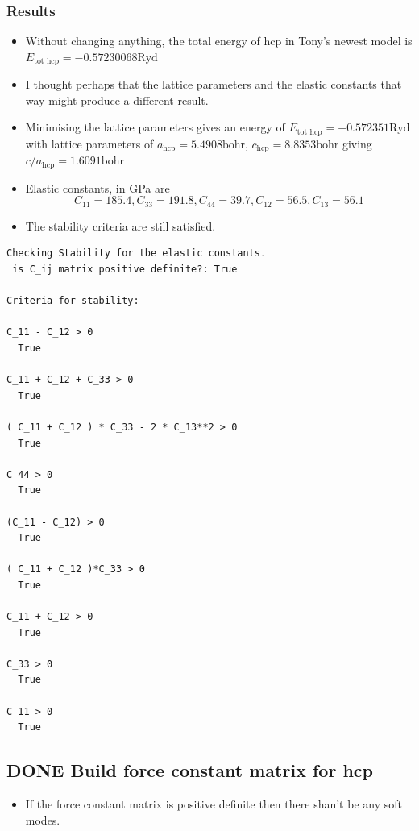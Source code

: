 \documentclass[11pt]{article}
\begin{document}
\subsubsection{Results}
\label{sec-1-9-1}
\begin{itemize}
\item Without changing anything, the total energy of hcp in Tony's newest
model is $E_{\text{tot hcp}} = -0.57230068 \text{Ryd}$
\item I thought perhaps that the lattice parameters and the elastic constants
that way might produce a different result.
\item Minimising the lattice parameters gives an energy of  $E_{\text{tot
      hcp}} = -0.572351 \text{Ryd}$ with lattice parameters of
$a_{\text{hcp}} = 5.4908 \text{bohr}$, $c_{\text{hcp}} = 8.8353 \text{bohr}$ giving $c/a_{\text{hcp}} = 1.6091 \text{bohr}$
\item Elastic constants, in GPa are \[ C_{11}=185.4, C_{33}=191.8, C_{44}= 39.7, C_{12}= 56.5, C_{13}= 56.1\]
\item The stability criteria are still satisfied.
\end{itemize}
\begin{verbatim}
Checking Stability for tbe elastic constants. 
 is C_ij matrix positive definite?: True

Criteria for stability:

C_11 - C_12 > 0 
  True

C_11 + C_12 + C_33 > 0 
  True

( C_11 + C_12 ) * C_33 - 2 * C_13**2 > 0 
  True

C_44 > 0 
  True

(C_11 - C_12) > 0
  True

( C_11 + C_12 )*C_33 > 0 
  True

C_11 + C_12 > 0
  True

C_33 > 0
  True

C_11 > 0
  True
\end{verbatim}
\subsection{{\bfseries\sffamily DONE} Build force constant matrix for hcp}
\label{sec-1-10}
\begin{itemize}
\item If the force constant matrix is positive definite then there shan't be
any soft modes.
\end{itemize}
\end{document}
